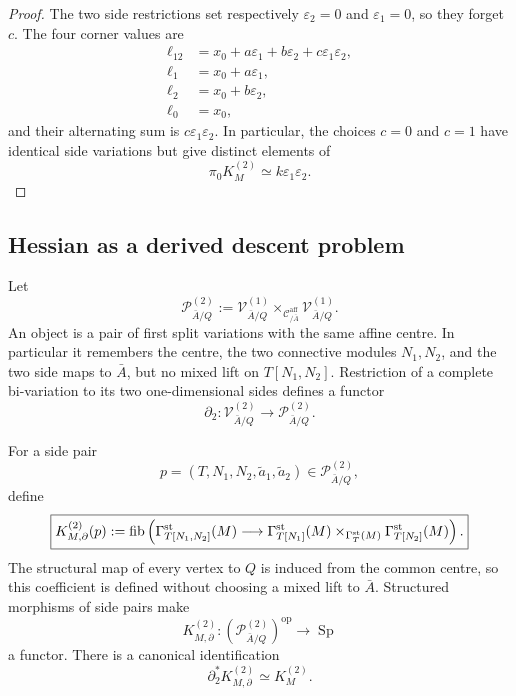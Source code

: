 \begin{proof}
The two side restrictions set respectively \(\varepsilon_2=0\) and \(\varepsilon_1=0\), so they forget \(c\). The four corner values are
\[
\begin{aligned}
\ell_{12}&=x_0+a\varepsilon_1+b\varepsilon_2+c\varepsilon_1\varepsilon_2,\\
\ell_1&=x_0+a\varepsilon_1,\\
\ell_2&=x_0+b\varepsilon_2,\\
\ell_0&=x_0,
\end{aligned}
\]
and their alternating sum is \(c\varepsilon_1\varepsilon_2\). In particular, the choices \(c=0\) and \(c=1\) have identical side variations but give distinct elements of
\[
    \pi_0K_M^{(2)}
    \simeq
    k\varepsilon_1\varepsilon_2.
\]
\end{proof}

\subsection{Hessian as a derived descent problem}

\begin{definition}
\label{def:var-hessian-side-category}
Let
\[
    \mathcal P^{(2)}_{\bar A/Q}
    :=
    \mathcal V^{(1)}_{\bar A/Q}
    \times_{\mathcal C^{\mathrm{aff}}_{/\bar A}}
    \mathcal V^{(1)}_{\bar A/Q}.
\]
An object is a pair of first split variations with the same affine centre. In particular it remembers the centre, the two connective modules \(N_1,N_2\), and the two side maps to \(\bar A\), but no mixed lift on \(T[N_1,N_2]\). Restriction of a complete bi-variation to its two one-dimensional sides defines a functor
\[
    \boxed{
    \partial_2:
    \mathcal V^{(2)}_{\bar A/Q}
    \longrightarrow
    \mathcal P^{(2)}_{\bar A/Q}.
    }
\]
\end{definition}

\begin{definition}
\label{def:var-hessian-side-coefficient}
For a side pair
\[
    p=(T,N_1,N_2,\widetilde a_1,\widetilde a_2)
    \in\mathcal P^{(2)}_{\bar A/Q},
\]
define
\[
    \boxed{
    K^{(2)}_{M,\partial}(p)
    :=
    \operatorname{fib}\left(
      \Gamma_{T[N_1,N_2]}^{\mathrm{st}}(M)
      \longrightarrow
      \Gamma_{T[N_1]}^{\mathrm{st}}(M)
      \times_{\Gamma_T^{\mathrm{st}}(M)}
      \Gamma_{T[N_2]}^{\mathrm{st}}(M)
    \right).
    }
\]
The structural map of every vertex to \(Q\) is induced from the common centre, so this coefficient is defined without choosing a mixed lift to \(\bar A\). Structured morphisms of side pairs make
\[
    K^{(2)}_{M,\partial}:
    (\mathcal P^{(2)}_{\bar A/Q})^{\mathrm{op}}
    \longrightarrow
    \operatorname{Sp}
\]
a functor. There is a canonical identification
\[
    \boxed{
    \partial_2^*K^{(2)}_{M,\partial}
    \simeq
    K_M^{(2)}.
    }
\]
\end{definition}

